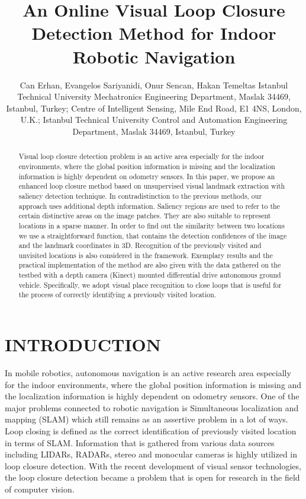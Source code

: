 \documentclass[]{spie}  %
\title{An Online Visual Loop Closure Detection Method for Indoor Robotic Navigation}
\author{
Can Erhan\supit{a}, 
Evangelos Sariyanidi\supit{b}, 
Onur Sencan\supit{c}, 
Hakan Temeltas\supit{c}
\skiplinehalf
\supit{a}Istanbul Technical University Mechatronics Engineering Department, Maslak 34469, Istanbul, Turkey; 
\supit{b}Centre of Intelligent Sensing, Mile End Road, E1 4NS, London, U.K.;
\supit{c}Istanbul Technical University Control and Automation Engineering Department, Maslak 34469, Istanbul, Turkey
}
\begin{document}
 
\maketitle 

\begin{abstract}
Visual loop closure detection problem is an active area especially for the indoor environments, where the global position information is missing and the localization information is highly dependent on odometry sensors. In this paper, we propose an enhanced loop closure method based on unsupervised visual landmark extraction with saliency detection technique. In contradistinction to the previous methods, our approach uses additional depth information. Saliency regions are used to refer to the certain distinctive areas on the image patches. They are also suitable to represent locations in a sparse manner.  In order to find out the similarity between two locations we use a straightforward function, that contains the detection confidences of the image and the landmark coordinates in 3D. Recognition of the previously visited and unvisited locations is also considered in the framework. Exemplary results and the practical implementation of the method are also given with the data gathered on the testbed with a depth camera (Kinect) mounted differential drive autonomous ground vehicle. Specifically, we adopt visual place recognition to close loops that is useful for the process of correctly identifying a previously visited location. 
\end{abstract}



\section{INTRODUCTION}

In mobile robotics, autonomous navigation is an active research area especially for the indoor environments, where the global position information is missing and the localization information is highly dependent on odometry sensors. One of the major problems connected to robotic navigation is Simultaneous localization and mapping (SLAM) which still remains as an assertive problem in a lot of ways. Loop closing is defined as the correct identification of previously visited location in terms of SLAM. Information that is gathered from various data sources including LIDARs, RADARs, stereo       and monocular cameras is highly utilized in loop closure detection. With the recent development of visual sensor technologies, the loop closure detection became a problem that is open for research in the field of computer vision.
\end{document}
